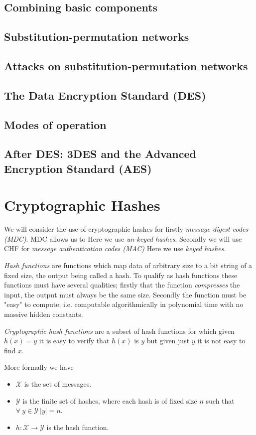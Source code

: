 \documentclass{article}
\theoremstyle{quest}
\newcommand{\X}{\mathcal{X}}
\newcommand{\Y}{\mathcal{Y}}
\begin{document}
\subsection{Combining basic components}
\subsection{Substitution-permutation networks}
\subsection{Attacks on substitution-permutation networks}
\subsection{The Data Encryption Standard (DES)}
\subsection{Modes of operation}
\subsection{After DES: 3DES and the Advanced Encryption Standard (AES)}

\section{Cryptographic Hashes}

We will consider the use of cryptographic hashes for
firstly \textit{message digest codes (MDC)}.
MDC allows us to
Here we use \textit{un-keyed hashes}.
Secondly we will use CHF for \textit{message authentication codes (MAC)}
Here we use \textit{keyed hashes}.

\textit{Hash functions} are functions which
map data of arbitrary size to a bit string of a fixed size,
the output being called a hash.
To qualify as hash functions these functions must have several qualities;
firstly that the function \textit{compresses} the input,
the output must always be the same size.
Secondly the function must be "easy" to compute;
i.e. computable algorithmically in polynomial time
with no massive hidden constants.

\textit{Cryptographic hash functions} are a subset of hash functions
for which given $h(x) = y$ it is easy to verify that $h(x)$ is $y$
but given just $y$ it is not easy to find $x$.

More formally we have
\begin{itemize}
	\item $\X$ is the set of messages.
	\item $\Y$ is the finite set of hashes,
		where each hash is of fixed size $n$ such that
		$\forall\ y \in \Y\ |y| = n$.
	\item $h : \X \rightarrow \Y$ is the hash function.
\end{itemize}
\end{document}
